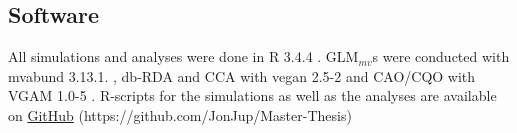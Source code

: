		
	\subsection{Software}
		All simulations and analyses were done in R 3.4.4 \citep{RCT2018}.
		GLM$_{mv}$s were conducted with mvabund 3.13.1. \citep{Wang2018}, db-RDA and CCA with vegan 2.5-2 \citep{Oksanen2018} and CAO/CQO with VGAM 1.0-5 \citep{Yee2018}. 
		R-scripts for the simulations as well as the analyses are available on \href{https://github.com/JonJup/Master-Thesis.git} {GitHub} (https://github.com/JonJup/Master-Thesis)


